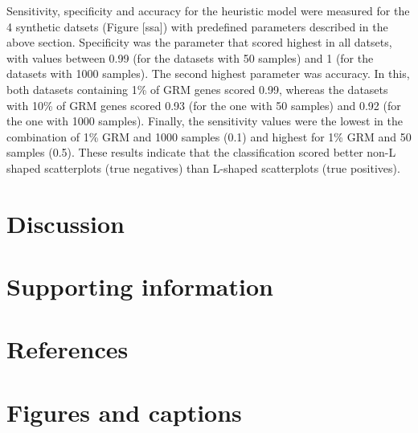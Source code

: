 \documentclass[10pt,letterpaper]{article}
\begin{document}
Sensitivity, specificity and accuracy for the heuristic model were
measured for the 4 synthetic datsets (Figure {[}ssa{]}) with predefined
parameters described in the above section. Specificity was the parameter
that scored highest in all datsets, with values between 0.99 (for the
datasets with 50 samples) and 1 (for the datasets with 1000 samples).
The second highest parameter was accuracy. In this, both datasets
containing 1\% of GRM genes scored 0.99, whereas the datasets with 10\%
of GRM genes scored 0.93 (for the one with 50 samples) and 0.92 (for the
one with 1000 samples). Finally, the sensitivity values were the lowest
in the combination of 1\% GRM and 1000 samples (0.1) and highest for 1\%
GRM and 50 samples (0.5). These results indicate that the classification
scored better non-L shaped scatterplots (true negatives) than L-shaped
scatterplots (true positives).

\hypertarget{discussion}{%
\section{Discussion}\label{discussion}}

\hypertarget{supporting-information}{%
\section{Supporting information}\label{supporting-information}}

\hypertarget{references}{%
\section*{References}\label{references}}

\clearpage

\hypertarget{figures-and-captions}{%
\section{Figures and captions}\label{figures-and-captions}}
\end{document}

